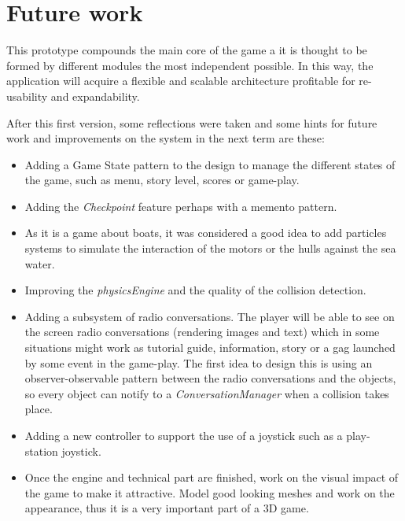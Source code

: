 \documentclass[]{article}
\begin{document}

\section{Future work}

This prototype compounds the main core of the game a it is thought to be formed by different modules the most independent possible. In this way, the application will acquire a flexible and scalable architecture profitable for re-usability and expandability.

After this first version, some reflections were taken and some hints for future work and improvements on the system in the next term are these:

\begin{itemize}
\item Adding a Game State pattern to the design to manage the different states of the game, such as menu, story level, scores or game-play.
\item Adding the \emph{Checkpoint} feature perhaps with a memento pattern.
\item As it is a game about boats, it was considered a good idea to add particles systems to simulate the interaction of the motors or the hulls against the sea water.
\item Improving the \emph{physicsEngine} and the quality of the collision detection.
\item Adding a subsystem of radio conversations. The player will be able to see on the screen radio conversations (rendering images and text) which in some situations might work as tutorial guide, information, story or a gag launched by some event in the game-play. The first idea to design this is using an observer-observable pattern between the radio conversations and the objects, so every object can notify to a \emph{ConversationManager} when a collision takes place.
\item Adding a new controller to support the use of a joystick such as a play-station joystick.
\item Once the engine and technical part are finished, work on the visual impact of the game to make it attractive. Model good looking meshes and work on the appearance, thus it is a very important part of a 3D game.
\end{itemize}
\end{document}
